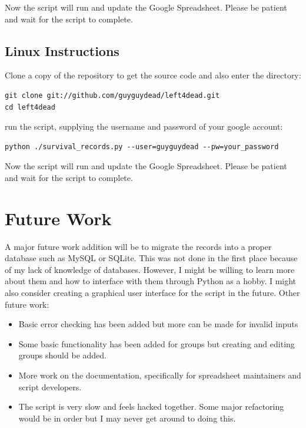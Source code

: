 Now the script will run and update the Google Spreadsheet. Please be patient and wait for the script to complete.

\subsection{Linux Instructions}
Clone a copy of the repository to get the source code and also enter the directory:
\begin{lstlisting}
git clone git://github.com/guyguydead/left4dead.git
cd left4dead
\end{lstlisting}
run the script, supplying the username and password of your google account:
\begin{lstlisting}
python ./survival_records.py --user=guyguydead --pw=your_password
\end{lstlisting}

Now the script will run and update the Google Spreadsheet. Please be patient and wait for the script to complete.

\section{Future Work}
A major future work addition will be to migrate the records into a proper database such as MySQL or SQLite. This was not done in the first place because of my lack of knowledge of databases. However, I might be willing to learn more about them and how to interface with them through Python as a hobby. I might also consider creating a graphical user interface for the script in the future. Other future work:
\begin{itemize}
\item Basic error checking has been added but more can be made for invalid inputs
\item Some basic functionality has been added for groups but creating and editing groups should be added.
\item More work on the documentation, specifically for spreadsheet maintainers and script developers.
\item The script is very slow and feels hacked together. Some major refactoring would be in order but I may never get around to doing this.
\end{itemize}

